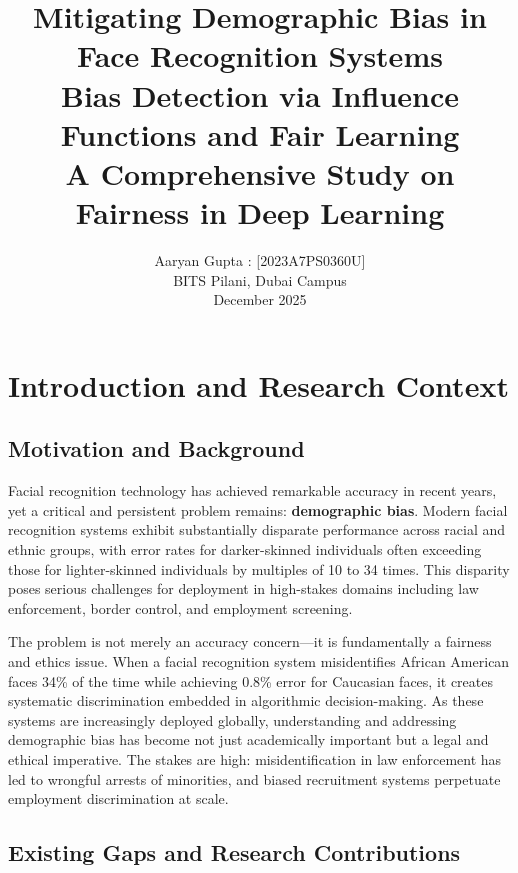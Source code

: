 \documentclass[11pt,a4paper,oneside]{report}
\title{\textbf{Mitigating Demographic Bias in Face Recognition Systems}\\Bias Detection via Influence Functions and Fair Learning\\[0.5cm]\large{A Comprehensive Study on Fairness in Deep Learning}}
\author{Aaryan Gupta : [2023A7PS0360U]\\\vspace{0.3cm}BITS Pilani, Dubai Campus\\\vspace{0.3cm}December 2025}
\date{}
\begin{document}
\maketitle

\newpage

\tableofcontents

\newpage


\chapter{Introduction and Research Context}

\section{Motivation and Background}

Facial recognition technology has achieved remarkable accuracy in recent years, yet a critical and persistent problem remains: \textbf{demographic bias}. Modern facial recognition systems exhibit substantially disparate performance across racial and ethnic groups, with error rates for darker-skinned individuals often exceeding those for lighter-skinned individuals by multiples of 10 to 34 times. This disparity poses serious challenges for deployment in high-stakes domains including law enforcement, border control, and employment screening.

The problem is not merely an accuracy concern---it is fundamentally a fairness and ethics issue. When a facial recognition system misidentifies African American faces 34\% of the time while achieving 0.8\% error for Caucasian faces, it creates systematic discrimination embedded in algorithmic decision-making. As these systems are increasingly deployed globally, understanding and addressing demographic bias has become not just academically important but a legal and ethical imperative. The stakes are high: misidentification in law enforcement has led to wrongful arrests of minorities, and biased recruitment systems perpetuate employment discrimination at scale.

\section{Existing Gaps and Research Contributions}
\end{document}
